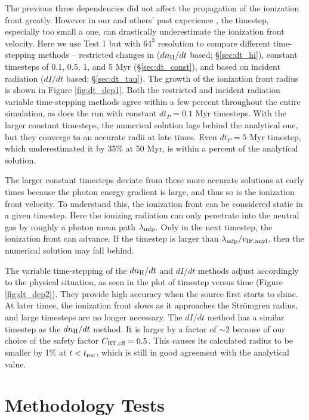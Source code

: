 \documentclass[useAMS,usenatbib,a4paper]{mn2e}
\begin{document}
The previous three dependencies did not affect the propagation of the
ionization front greatly.  However in our and others' past experience
\citep[e.g.][]{Shapiro04, Mellema06, Petkova09}, the timestep,
especially too small a one, can drastically underestimate the
ionization front velocity.  Here we use Test 1 but with $64^3$
resolution to compare different time-stepping methods -- restricted
changes in \hii ($dn_{\rm H}/dt$ based; \S\ref{sec:dt_hi}),
constant timesteps of 0.1, 0.5, 1, and 5 Myr (\S\ref{sec:dt_const}),
and based on incident radiation ($dI/dt$ based; \S\ref{sec:dt_tau}).
The growth of the ionization front radius is shown in Figure
\ref{fig:dt_dep1}.  Both the \hii restricted and incident
radiation variable time-stepping methods agree within a few percent
throughout the entire simulation, as does the run with constant $dt_P
= 0.1$ Myr timesteps.  With the larger constant timesteps, the
numerical solution lags behind the analytical one, but they converge
to an accurate \hii radii at late times.  Even $dt_P = 5$ Myr
timestep, which underestimated it by 35\% at 50 Myr, is within a
percent of the analytical solution.

The larger constant timesteps deviate from these more accurate
solutions at early times because the photon energy gradient is large,
and thus so is the ionization front velocity.  To understand this, the
ionization front can be considered static in a given timestep.  Here
the ionizing radiation can only penetrate into the neutral gas by
roughly a photon mean path $\lambda_{\rm mfp}$.  Only in the next
timestep, the ionization front can advance.  If the timestep is larger
than $\lambda_{\rm mfp} / v_{\rm IF, anyl}$, then the numerical
solution may fall behind.

The variable time-stepping of the $dn_{\rm H}/dt$ and $dI/dt$ methods
adjust accordingly to the physical situation, as seen in the plot of
timestep versus time (Figure \ref{fig:dt_dep2}).  They provide high
accuracy when the source first starts to shine.  At later times, the
ionization front slows as it approaches the Str\"{o}mgren radius, and
large timesteps are no longer necessary.  The $dI/dt$ method has a
similar timestep as the $dn_{\rm H}/dt$ method.  It is larger by a
factor of $\sim 2$ because of our choice of the safety factor $C_{\rm
  RT, cfl} = 0.5$.  This causes its calculated radius to be smaller by
1\% at $t < t_{\rm rec}$, which is still in good agreement with the
analytical value.

\section{Methodology Tests}
\end{document}
